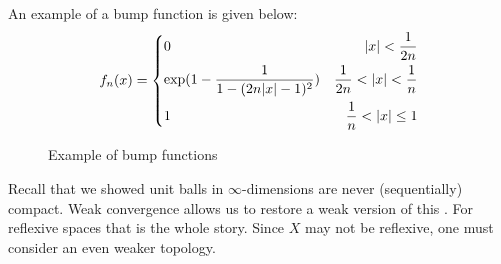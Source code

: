 \documentclass{article}
\begin{document}
\begin{unexaminable}
%   
An example of a bump function is given below:
\begin{equation}
f_n(x)=
\left\{
\begin{aligned}
&0 &|x|<\frac{1}{2n}\\
&{\rm exp}(1-\frac{1}{1-(2n|x|-1)^2}) &\frac{1}{2n}<|x|<\frac{1}{n}\\
&1 &\frac{1}{n}<|x|\leq1\\
\end{aligned}
\right.
\end{equation}


\begin{figure}[H]
  \centering
  \caption{Example of bump functions}
\end{figure} 



\end{unexaminable}

Recall that we showed unit balls in $\infty$-dimensions are never (sequentially) compact. Weak convergence allows us to restore a weak version of this . %
For reflexive spaces that is the whole story.  Since $X$ may not be reflexive, one must consider an even weaker topology.  
\end{document}
